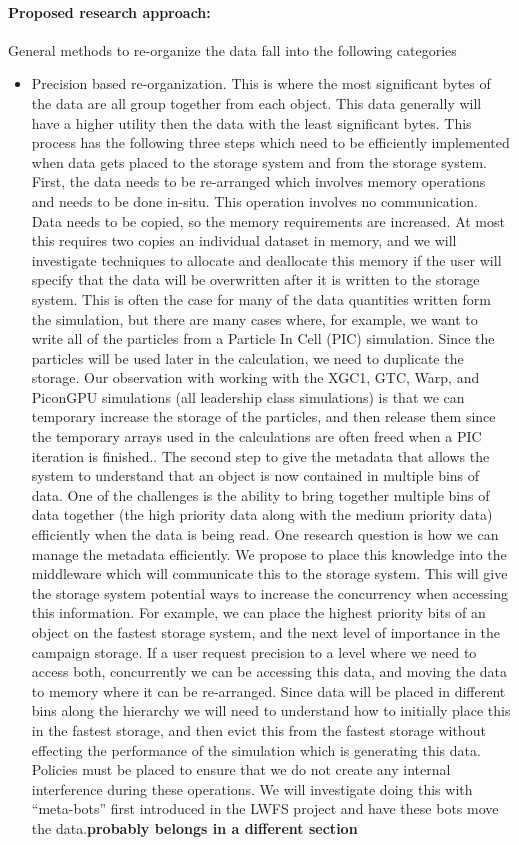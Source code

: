 \paragraph{Proposed research approach:}
General methods to re-organize the data fall into the following categories
\begin{itemize}
\item Precision based re-organization. This is where the most significant bytes of the data are
all group together from each object. This data generally will have a higher utility then the data with
the least significant bytes.  This process has the following three steps which need to be
efficiently implemented when data gets placed to the storage system and from the storage 
system. 
%
First, the data needs to be re-arranged which involves memory operations and needs
to be done in-situ. This operation involves no communication.  Data needs to be copied, so
the memory requirements are increased. At most this requires two copies an individual dataset
in memory, and we will investigate techniques to allocate and deallocate this memory if the user
will specify that the data will be overwritten after it is written to the storage system. This is often
the case for many of the data quantities written form the simulation, but there are many cases
where, for example, we want to write all of the particles from a Particle In Cell (PIC) simulation. 
Since the particles will be used later in the calculation, we need to duplicate the storage. Our
observation with working with the XGC1, GTC, Warp, and PiconGPU simulations (all leadership
class simulations) is that we can temporary increase the storage of the particles, and then 
release them since the temporary arrays used in the calculations are often freed when a PIC
iteration is finished.. 
%
The second step to give the metadata that allows the system to understand that an object is now contained in multiple bins of data. One of the challenges is the ability to bring together multiple bins
of data together (the high priority data along with the medium priority data) efficiently when the 
data is being read.  One research question is how we can manage the metadata efficiently.
We propose to place this knowledge into the middleware which will communicate this to the 
storage system.  This will give the storage system potential ways to increase the concurrency 
when accessing this information. For example, we can place the highest priority bits of an object
on the fastest storage system, and the next level of importance in the campaign storage. If a 
user request precision to a level where we need to access both, concurrently we can be
accessing this data, and moving the data to memory where it can be re-arranged. 
%
Since data will be placed in different bins along the hierarchy we will need to understand how
to initially place this in the fastest storage, and then evict this from the fastest storage without
effecting the performance of the simulation which is generating this data. Policies must be 
placed to ensure that we do not create any internal interference during these operations. We
will investigate doing this with ``meta-bots'' first introduced in the LWFS project and have 
these bots move the data.{\bf probably belongs in a different section} 


\end{itemize}

